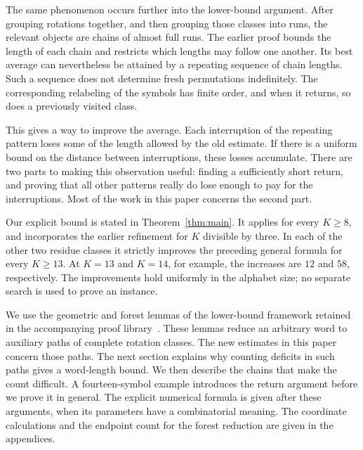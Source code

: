The same phenomenon occurs further into the lower-bound argument.
After grouping rotations together, and then grouping those classes into
runs, the relevant objects are chains of almost full runs. The earlier
proof bounds the length of each chain and restricts which lengths may
follow one another. Its best average can nevertheless be attained by a
repeating sequence of chain lengths. Such a sequence does not determine
fresh permutations indefinitely. The corresponding relabeling of the
symbols has finite order, and when it returns, so does a previously
visited class.

This gives a way to improve the average. Each interruption of the
repeating pattern loses some of the length allowed by the old estimate.
If there is a uniform bound on the distance between interruptions, these
losses accumulate. There are two parts to making this observation useful:
finding a sufficiently short return, and proving that all other patterns
really do lose enough to pay for the interruptions. Most of the work in
this paper concerns the second part.

Our explicit bound is stated in Theorem~\ref{thm:main}. It applies for
every $K\ge8$, and incorporates the earlier refinement for $K$ divisible
by three. In each of the other two residue classes it strictly improves
the preceding general formula for every $K\ge13$. At $K=13$ and
$K=14$, for example, the increases are $12$ and $58$, respectively. The improvements hold uniformly
in the alphabet size; no separate search is used to prove an instance.

We use the geometric and forest lemmas of the lower-bound framework
retained in the accompanying proof library~\cite{pantone-framework}.
These lemmas reduce an arbitrary word to auxiliary paths of complete
rotation classes. The new estimates in this paper concern those paths.
The next section explains why counting deficits in such paths gives a
word-length bound. We then describe the chains that make the count
difficult. A fourteen-symbol example introduces the return argument
before we prove it in general. The explicit numerical formula is given
after these arguments, when its parameters have a combinatorial meaning.
The coordinate calculations and the endpoint count for the forest
reduction are given in the appendices.
